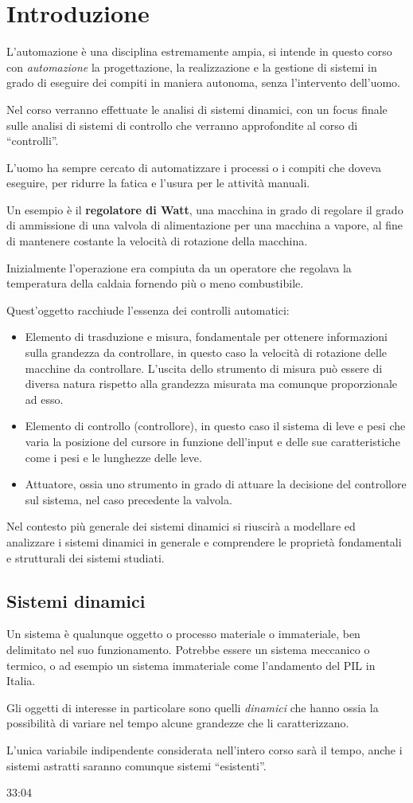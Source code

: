\chapter{Introduzione}
L'automazione è una disciplina estremamente ampia, si intende in questo corso con
\textit{automazione} la progettazione, la realizzazione e la gestione di sistemi in grado di
eseguire dei compiti in maniera autonoma, senza l'intervento dell'uomo.

Nel corso verranno effettuate le analisi di sistemi dinamici, con un focus finale sulle analisi di
sistemi di controllo che verranno approfondite al corso di ``controlli''.

L'uomo ha sempre cercato di automatizzare i processi o i compiti che doveva eseguire, per ridurre
la fatica e l'usura per le attività manuali.

Un esempio è il \textbf{regolatore di Watt}, una macchina in grado di regolare il grado di
ammissione di una valvola di alimentazione per una macchina a vapore, al fine di mantenere costante
la velocità di rotazione della macchina.

Inizialmente l'operazione era compiuta da un operatore che regolava la temperatura della caldaia
fornendo più o meno combustibile.

Quest'oggetto racchiude l'essenza dei controlli automatici:
\begin{itemize}
 \item Elemento di trasduzione e misura, fondamentale per ottenere informazioni sulla grandezza da
controllare, in questo caso la velocità di rotazione delle macchine da controllare. L'uscita dello
strumento di misura può essere di diversa natura rispetto alla grandezza misurata ma comunque
proporzionale ad esso.
 \item Elemento di controllo (controllore), in questo caso il sistema di leve e pesi che varia la
posizione del cursore in funzione dell'input e delle sue caratteristiche come i pesi e le lunghezze
delle leve.
\item Attuatore, ossia uno strumento in grado di attuare la decisione del controllore sul sistema,
nel caso precedente la valvola.
\end{itemize}

Nel contesto più generale dei sistemi dinamici si riuscirà a modellare ed analizzare i sistemi
dinamici in generale e comprendere le proprietà fondamentali e strutturali dei sistemi studiati.

\section{Sistemi dinamici}
Un sistema è qualunque oggetto o processo materiale o immateriale, ben delimitato nel suo
funzionamento.
Potrebbe essere un sistema meccanico o termico, o ad esempio un sistema immateriale come
l'andamento del PIL in Italia.

Gli oggetti di interesse in particolare sono quelli \textit{dinamici}
che hanno ossia la possibilità di variare nel tempo alcune grandezze che li caratterizzano.

L'unica variabile indipendente considerata nell'intero corso sarà il tempo, anche i sistemi
astratti saranno comunque sistemi ``esistenti''.

33:04
